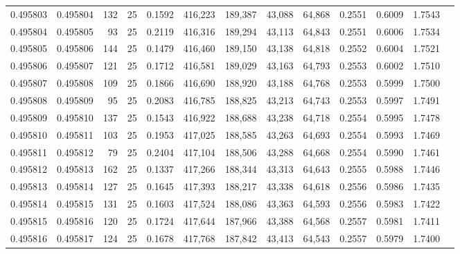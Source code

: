 \begin{tabular}{rrrrrrrrrrrrr}
0.495803 & 0.495804 &   132 &  25 &                                     0.1592 & 416,223 & 189,387 &  43,088 &  64,868 & 0.2551 & 0.6009 & 1.7543 \\
0.495804 & 0.495805 &    93 &  25 &                                     0.2119 & 416,316 & 189,294 &  43,113 &  64,843 & 0.2551 & 0.6006 & 1.7534 \\
0.495805 & 0.495806 &   144 &  25 &                                     0.1479 & 416,460 & 189,150 &  43,138 &  64,818 & 0.2552 & 0.6004 & 1.7521 \\
0.495806 & 0.495807 &   121 &  25 &                                     0.1712 & 416,581 & 189,029 &  43,163 &  64,793 & 0.2553 & 0.6002 & 1.7510 \\
0.495807 & 0.495808 &   109 &  25 &                                     0.1866 & 416,690 & 188,920 &  43,188 &  64,768 & 0.2553 & 0.5999 & 1.7500 \\
0.495808 & 0.495809 &    95 &  25 &                                     0.2083 & 416,785 & 188,825 &  43,213 &  64,743 & 0.2553 & 0.5997 & 1.7491 \\
0.495809 & 0.495810 &   137 &  25 &                                     0.1543 & 416,922 & 188,688 &  43,238 &  64,718 & 0.2554 & 0.5995 & 1.7478 \\
0.495810 & 0.495811 &   103 &  25 &                                     0.1953 & 417,025 & 188,585 &  43,263 &  64,693 & 0.2554 & 0.5993 & 1.7469 \\
0.495811 & 0.495812 &    79 &  25 &                                     0.2404 & 417,104 & 188,506 &  43,288 &  64,668 & 0.2554 & 0.5990 & 1.7461 \\
0.495812 & 0.495813 &   162 &  25 &                                     0.1337 & 417,266 & 188,344 &  43,313 &  64,643 & 0.2555 & 0.5988 & 1.7446 \\
0.495813 & 0.495814 &   127 &  25 &                                     0.1645 & 417,393 & 188,217 &  43,338 &  64,618 & 0.2556 & 0.5986 & 1.7435 \\
0.495814 & 0.495815 &   131 &  25 &                                     0.1603 & 417,524 & 188,086 &  43,363 &  64,593 & 0.2556 & 0.5983 & 1.7422 \\
0.495815 & 0.495816 &   120 &  25 &                                     0.1724 & 417,644 & 187,966 &  43,388 &  64,568 & 0.2557 & 0.5981 & 1.7411 \\
0.495816 & 0.495817 &   124 &  25 &                                     0.1678 & 417,768 & 187,842 &  43,413 &  64,543 & 0.2557 & 0.5979 & 1.7400 \\

\end{tabular}
